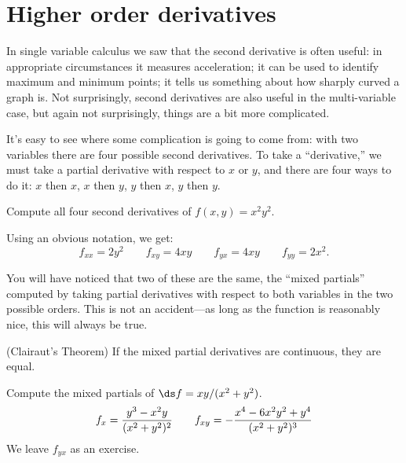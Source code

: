\section{Higher order derivatives}{}{}

In single variable calculus we saw that the second derivative is often
useful: in appropriate circumstances it measures acceleration; it can
be used to identify maximum and minimum points; it tells us something
about how sharply curved a graph is. Not surprisingly, second
derivatives are also useful in the multi-variable case, but again not
surprisingly, things are a bit more complicated.

It's easy to see where some complication is going to come from: with
two variables there are four possible second derivatives. To take a
``derivative,'' we must take a partial derivative with respect to $x$
or $y$, and there are four ways to do it: $x$ then $x$, $x$ then $y$, 
$y$ then $x$, $y$ then $y$.

\exam Compute all four second derivatives of $f(x,y)=x^2y^2$.

Using an obvious notation, we get:
$$f_{xx}=2y^2\qquad f_{xy}=4xy\qquad f_{yx}=4xy\qquad f_{yy}=2x^2.$$
\endexam

You will have noticed that two of these are the same, the ``mixed
partials'' computed by taking partial derivatives with respect to both
variables in the two possible orders. This is not an accident---as
long as the function is reasonably nice, this will always be true.

\begin{theorem} (Clairaut's Theorem) If the mixed partial derivatives are
continuous, they are equal.
\end{theorem}
\label{thm:clairaut}

\exam Compute the mixed partials of $\ds f=xy/(x^2+y^2)$.
$$
f_x={y^3-x^2y\over(x^2+y^2)^2}\qquad
f_{xy}=-{x^4-6x^2y^2+y^4\over (x^2+y^2)^3}
$$
We leave $f_{yx}$ as an exercise.
\endexam

